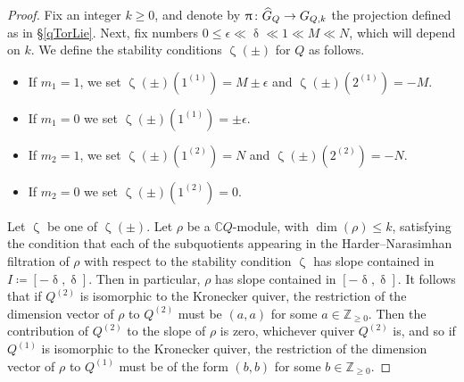 \documentclass{amsart}
\renewcommand{\delta}{\updelta}
\renewcommand{\zeta}{\upzeta}
\renewcommand{\pi}{\uppi\hspace{0.05em}}
\theoremstyle{plain}%
\theoremstyle{definition}
\theoremstyle{remark}
\begin{document}
\begin{proof}
Fix an integer $k\geq 0$, and denote by $\pi\colon \widehat{G}_Q\rightarrow G_{Q,k}$ the projection defined as in \S\ref{qTorLie}.  Next, fix numbers $0\leq \epsilon\ll \delta\ll 1\ll M\ll N$, which will depend on $k$.  We define the stability conditions $\zeta(\pm)$ for $Q$ as follows.
\begin{itemize}
    \item
    If $m_1=1$, we set $\zeta(\pm)(1^{(1)})=M\pm\epsilon$ and $\zeta(\pm)(2^{(1)})=-M$.
    \item
    If $m_1=0$ we set $\zeta(\pm)(1^{(1)})=\pm \epsilon$.
    \item 
    If $m_2=1$, we set $\zeta(\pm)(1^{(2)})=N$ and $\zeta(\pm)(2^{(2)})=-N$.
    \item
    If $m_2=0$ we set $\zeta(\pm)(1^{(2)})=0$.
\end{itemize}
Let $\zeta$ be one of $\zeta(\pm)$.  Let $\rho$ be a $\mathbb{C}Q$-module, with $\dim(\rho)\leq k$, satisfying the condition that each of the subquotients appearing in the Harder--Narasimhan filtration of $\rho$ with respect to the stability condition $\zeta$ has slope contained in $I\coloneqq [-\delta,\delta]$.  Then in particular, $\rho$ has slope contained in $[-\delta,\delta]$.  It follows that if $Q^{(2)}$ is isomorphic to the Kronecker quiver, the restriction of the dimension vector of $\rho$ to $Q^{(2)}$ must be $(a,a)$ for some $a\in \mathbb{Z}_{\geq 0}$. Then the contribution of $Q^{(2)}$ to the slope of $\rho$ is zero, whichever quiver $Q^{(2)}$ is, and so if $Q^{(1)}$ is isomorphic to the Kronecker quiver, the restriction of the dimension vector of $\rho$ to $Q^{(1)}$ must be of the form $(b,b)$ for some $b\in\mathbb{Z}_{\geq 0}$.  


\end{proof}
\end{document}
